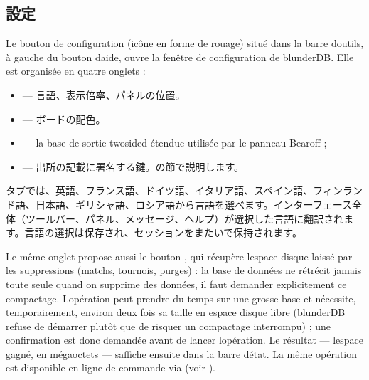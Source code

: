 \documentclass[letterpaper,10pt,dvipdfmx]{sphinxmanual}
\begin{document}
\subsection{設定}
\label{\detokenize{manuel:configuration}}\label{\detokenize{manuel:id2}}
\sphinxAtStartPar
Le bouton de configuration (icône en forme de rouage) situé dans la barre
d\textquotesingle{}outils, à gauche du bouton d\textquotesingle{}aide, ouvre la fenêtre de configuration de
blunderDB. Elle est organisée en quatre onglets :
\begin{itemize}
\item {} 
\sphinxAtStartPar
{} — 言語、表示倍率、パネルの位置。

\item {} 
\sphinxAtStartPar
{} — ボードの配色。

\item {} 
\sphinxAtStartPar
{} — la base de sortie two\sphinxhyphen{}sided étendue utilisée par le panneau
Bearoff ;

\item {} 
\sphinxAtStartPar
{} — 出所の記載に署名する鍵。{\hyperref[\detokenize{manuel:diffusion-controlee}]{}}の節で説明します。

\end{itemize}

\sphinxAtStartPar
{}タブでは、英語、フランス語、ドイツ語、イタリア語、スペイン語、フィンランド語、日本語、ギリシャ語、ロシア語から言語を選べます。インターフェース全体（ツールバー、パネル、メッセージ、ヘルプ）が選択した言語に翻訳されます。言語の選択は保存され、セッションをまたいで保持されます。

\sphinxAtStartPar
Le même onglet propose aussi le bouton , qui récupère
l\textquotesingle{}espace disque laissé par les suppressions (matchs, tournois, purges) : la
base de données ne rétrécit jamais toute seule quand on supprime des données,
il faut demander explicitement ce compactage. L\textquotesingle{}opération peut prendre du
temps sur une grosse base et nécessite, temporairement, environ deux fois sa
taille en espace disque libre (blunderDB refuse de démarrer plutôt que de
risquer un compactage interrompu) ; une confirmation est donc demandée avant
de lancer l\textquotesingle{}opération. Le résultat — l\textquotesingle{}espace gagné, en mégaoctets — s\textquotesingle{}affiche
ensuite dans la barre d\textquotesingle{}état. La même opération est disponible en ligne de
commande via  (voir {\hyperref[\detokenize{cli:cli}]{}}).
\end{document}
